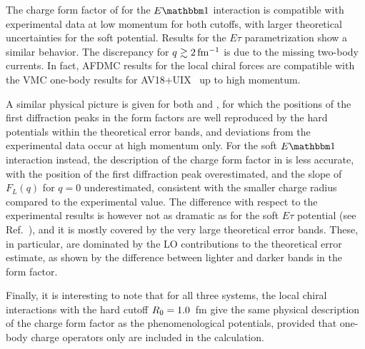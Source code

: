 \documentclass[aps,prc,twocolumn,superscriptaddress,floatfix]{revtex4-1}
\begin{document}
The charge form factor of  for the $E\mathbbm1$ interaction is compatible
with experimental data at low momentum for both cutoffs, with larger theoretical uncertainties
for the soft potential. Results for the $E\tau$ parametrization
show a similar behavior. The discrepancy for $q\gtrsim2\,\rm fm^{-1}$ is
due to the missing two-body currents. In fact, AFDMC results for the local chiral forces 
are compatible with the VMC one-body results for AV18+UIX~\cite{Wiringa:1998}
up to high momentum.

A similar physical picture is given for both  and , 
for which the positions of the first diffraction peaks in the form factors 
are well reproduced by the hard potentials within the theoretical error bands, 
and deviations from the experimental data occur at high momentum only.
For the soft $E\mathbbm1$ interaction instead, the description of the charge form factor in
 is less accurate, with the position of the first diffraction 
peak overestimated, and the slope of $F_L(q)$ for $q=0$ underestimated, 
consistent with the smaller charge radius compared to the experimental value.
The difference with respect to the experimental results is however not as 
dramatic as for the soft $E\tau$ potential (see Ref.~\cite{Lonardoni:2017afdmc}),
and it is mostly covered by the very large theoretical error bands. These, 
in particular, are dominated by the LO contributions to the theoretical error
estimate, as shown by the difference between lighter and darker bands in the
form factor.

Finally, it is interesting to note that for all three systems, the local chiral interactions with the
hard cutoff $R_0=1.0\,\rm$ fm give the same physical description of the charge form factor as 
the phenomenological potentials, provided that one-body charge operators only are included in the calculation.
\end{document}
